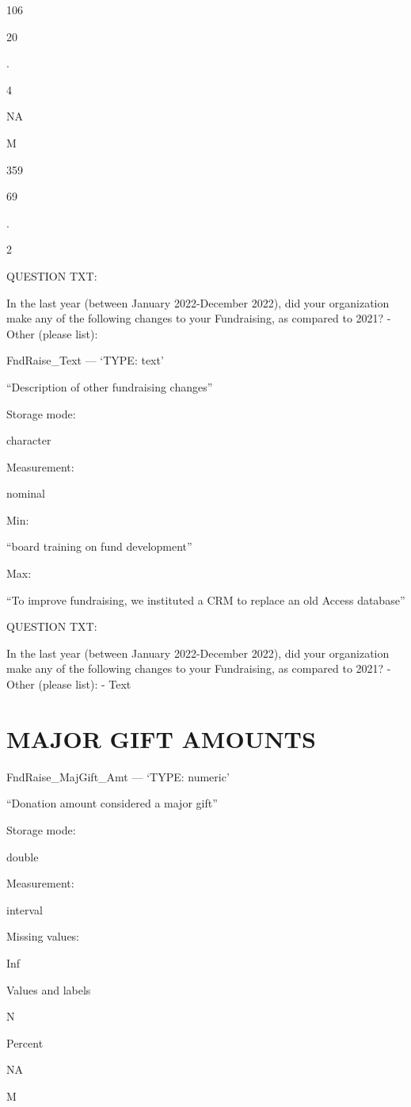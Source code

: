 \documentclass[
  letterpaper,
]{scrbook}
\begin{document}
106

20

.

4

NA

M

359

69

.

2

QUESTION TXT:

In the last year (between January 2022-December 2022), did your
organization make any of the following changes to your Fundraising, as
compared to 2021? - Other (please list):

FndRaise\_Text --- {`TYPE: text'}

``Description of other fundraising changes''

Storage mode:

character

Measurement:

nominal

Min:

``board training on fund development''

Max:

``To improve fundraising, we instituted a CRM to replace an old Access
database''

QUESTION TXT:

In the last year (between January 2022-December 2022), did your
organization make any of the following changes to your Fundraising, as
compared to 2021? - Other (please list): - Text

\chapter{MAJOR GIFT AMOUNTS}\label{major-gift-amounts-1}

FndRaise\_MajGift\_Amt --- {`TYPE: numeric'}

``Donation amount considered a major gift''

Storage mode:

double

Measurement:

interval

Missing values:

Inf

Values and labels

N

Percent

NA

M
\end{document}
